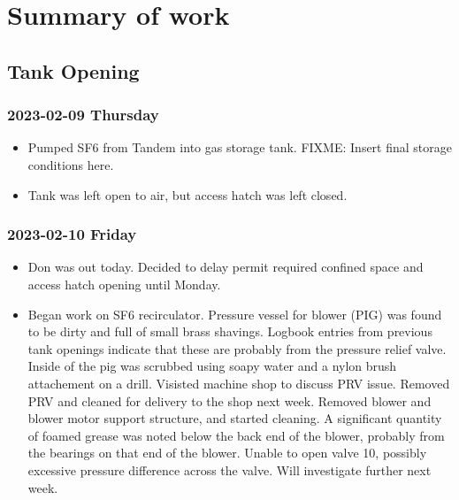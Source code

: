 \documentclass{scrartcl}
\begin{document}
\section{Summary of work} 

\subsection{Tank Opening}

\subsubsection{2023-02-09 Thursday}
\begin{itemize}
    \item Pumped SF6 from Tandem into gas storage tank. FIXME: Insert final storage conditions here.
    \item Tank was left open to air, but access hatch was left closed.
\end{itemize}

\subsubsection{2023-02-10 Friday}
\begin{itemize}
    \item Don was out today.  Decided to delay permit required confined space and access hatch opening until Monday.
	\item Began work on SF6 recirculator.  Pressure vessel for blower (PIG) was found to be dirty and full of small brass 
	shavings.  Logbook entries from previous tank openings indicate that these are probably from the pressure relief 
	valve.  Inside of the pig was scrubbed using soapy water and a nylon brush attachement on a drill.  Visisted 
	machine shop to discuss PRV issue.  Removed PRV and cleaned for delivery to the shop next week.  Removed blower and
	blower motor support structure, and started cleaning.  A significant quantity of foamed grease was noted below the back
	end of the blower, probably from the bearings on that end of the blower.  
	Unable to open valve 10, possibly excessive pressure difference across
	the valve.  Will investigate further next week.
\end{itemize}
\end{document}
